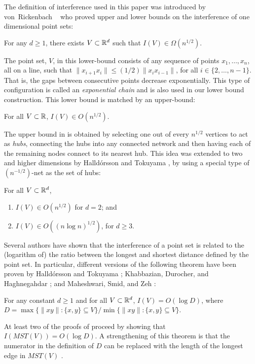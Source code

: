 \documentclass{patmorin}
\newcommand{\mst}{\mathit{MST}}
\begin{document}
The definition of interference used in this paper was introduced by
von~Rickenbach \etal\ \cite{vR05} who proved upper and
lower bounds on the interference of one dimensional point sets:
\begin{thm}
For any $d\ge 1$, there exists $V\subset\mathbb{R}^{d}$ such
that $I(V)\in\Omega(n^{1/2})$.
\end{thm}
The point set, $V$, in this lower-bound consists of any sequence of
points $x_1,\ldots,x_n$, all on a line, such that $\|x_{i+1}x_i\| \le (1/2)\|x_{i}x_{i-1}\|$,
for all $i\in\{2,\ldots,n-1\}$.  That is, the gaps between consecutive
points decrease exponentially. This type of configuration is called an \emph{exponential chain} and is also used in our lower bound construction.
This lower bound is matched by an upper-bound:
\begin{thm}
For all $V\subset\mathbb{R}$, $I(V)\in O(n^{1/2})$.
\end{thm}
The upper bound in  is obtained by selecting one out
of every $n^{1/2}$
vertices to act as \emph{hubs}, connecting the hubs into any connected
network and then having each of the remaining nodes connect to its
nearest hub.  This idea was extended to two and higher dimensions
by Halld\'orsson and Tokuyama \cite{ht08}, by using a special type of
$(n^{-1/2})$-net as the set of hubs:
\begin{thm}
For all $V\subset\mathbb{R}^d$,
\begin{enumerate}
\item $I(V)\in O(n^{1/2})$ for $d=2$; and
\item $I(V)\in O((n\log n)^{1/2})$, for $d\ge 3$.
\end{enumerate}
\end{thm}

Several authors have shown that the interference of a point set is
related to the (logarithm of) the ratio between the longest and shortest
distance defined by the point set.  In particular, different versions
of the following theorem have been proven by Halld\'orsson and Tokuyama
\cite{ht08}; Khabbazian, Durocher, and Haghnegahdar
\cite{kdhk15}; and Maheshwari, Smid, and Zeh \cite{msz11}:
\begin{thm}
  For any constant $d\ge 1$ and for all $V\subset\mathbb{R}^d$,
  $I(V)=O(\log D)$, where $D=\max\{\|xy\|: \{x,y\}\subseteq V\}/\min\{\|xy\|:
  \{x,y\}\subseteq V\}$.
\end{thm}
At least two of the proofs of  proceed by showing that
$I(\mst(V))=O(\log D)$.  A strengthening of this theorem  is that the
numerator in the definition of $D$ can be replaced with the length of
the longest edge in $\mst(V)$ \cite{kdhk15,msz11}.
\end{document}
